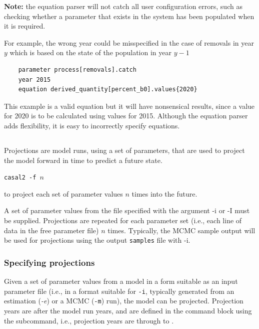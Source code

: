 \textbf{Note:} the equation parser will not catch all user configuration errors, such as checking whether a parameter that exists in the system has been populated when it is required.

For example, the wrong year could be misspecified in the case of removals in year $y$ which is based on the state of the population in year $y-1$

{\small{\begin{verbatim}
	parameter process[removals].catch
	year 2015
	equation derived_quantity[percent_b0].values{2020}
\end{verbatim}}}

This example is a valid equation but it will have nonsensical results, since a value for 2020 is to be calculated using values for 2015. Although the equation parser adds flexibility, it is easy to incorrectly specify equations.

\subsection{} \label{sec:Project}

Projections are model runs, using a set of parameters, that are used to project the model forward in time to predict a future state. 

\texttt{casal2 -f $n$} 

to project each set of parameter values $n$ times into the future. 

A set of parameter values from the file specified with the argument -i or -I must be supplied. Projections are repeated for each parameter set (i.e., each line of data in the free parameter file) $n$ times. Typically, the MCMC sample output will be used for projections using the output \texttt{samples} file with -i.

\subsubsection{Specifying projections}

Given a set of parameter values from a model in a form suitable as an input parameter file (i.e., in a format suitable for \texttt{-i}, typically generated from an  estimation (\textit{-e}) or a MCMC (\texttt{-m}) run), the model can be projected. Projection years are after the model run years, and are defined in the  command block using the  subcommand, i.e., projection years are  through to .

